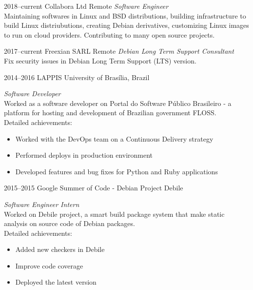 \documentclass[print]{friggeri-cv}
\begin{document}
\begin{entrylist}


\entry
{2018--current}
{Collabora Ltd}
{Remote}
{\emph{Software Engineer} \\
  Maintaining softwares in Linux and BSD distributions, building infrastructure
  to build Linux distriubutions, creating Debian derivatives, customizing Linux
  images to run on cloud providers. Contributing to many open source projects.
}


\entry
{2017--current}
{Freexian SARL}
{Remote}
{\emph{Debian Long Term Support Consultant} \\
  Fix security issues in Debian Long Term Support (LTS) version.
}


\entry
{2014--2016}
{LAPPIS}
{University of Brasília, Brazil}
{\emph{Software Developer} \\
  Worked as a software developer on Portal do Software Público
  Brasileiro - a platform for hosting and development of Brazilian government
  FLOSS. \\
Detailed achievements:
\begin{itemize}
  \item Worked with the DevOps team on a Continuous Delivery strategy
  \item Performed deploys in production environment
  \item Developed features and bug fixes for Python and Ruby applications
\end{itemize}
  }


\entry
{2015--2015}
{Google Summer of Code - Debian Project}
{Debile}
{\emph{Software Engineer Intern} \\
  Worked on Debile project, a smart build package system that make static
  analysis on source code of Debian packages. \\
Detailed achievements:
\begin{itemize}
  \item Added new checkers in Debile
  \item Improve code coverage
  \item Deployed the latest version
\end{itemize}}


\end{entrylist}
\end{document}
